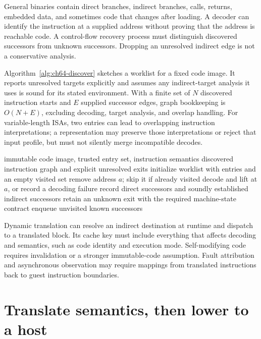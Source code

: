 General binaries contain direct branches, indirect branches, calls, returns, embedded data, and sometimes code that changes after loading.
A decoder can identify the instruction at a supplied address without proving that the address is reachable code.
A control-flow recovery process must distinguish discovered successors from unknown successors.
Dropping an unresolved indirect edge is not a conservative analysis.

Algorithm~\ref{alg:ch64-discover} sketches a worklist for a fixed code image.
It reports unresolved targets explicitly and assumes any indirect-target analysis it uses is sound for its stated environment.
With a finite set of $N$ discovered instruction starts and $E$ supplied successor edges, graph bookkeeping is $O(N+E)$, excluding decoding, target analysis, and overlap handling.
For variable-length ISAs, two entries can lead to overlapping instruction interpretations; a representation may preserve those interpretations or reject that input profile, but must not silently merge incompatible decodes.

\begin{algorithm}[htbp]
\caption{Discover control flow while retaining unresolved behavior.}
\label{alg:ch64-discover}
\begin{pseudocode}
\Require immutable code image, trusted entry set, instruction semantics
\Ensure discovered instruction graph and explicit unresolved exits
\State initialize worklist with entries and an empty visited set
  \State remove address $a$; skip it if already visited
  \State decode and lift at $a$, or record a decoding failure
  \State record direct successors and soundly established indirect successors
    \State retain an unknown exit with the required machine-state contract
  \EndIf
  \State enqueue unvisited known successors
\EndWhile
\end{pseudocode}
\end{algorithm}

Dynamic translation can resolve an indirect destination at runtime and dispatch to a translated block.
Its cache key must include everything that affects decoding and semantics, such as code identity and execution mode.
Self-modifying code requires invalidation or a stronger immutable-code assumption.
Fault attribution and asynchronous observation may require mappings from translated instructions back to guest instruction boundaries.

\section{Translate semantics, then lower to a host}
\label{sec:ch64-cross-isa}


